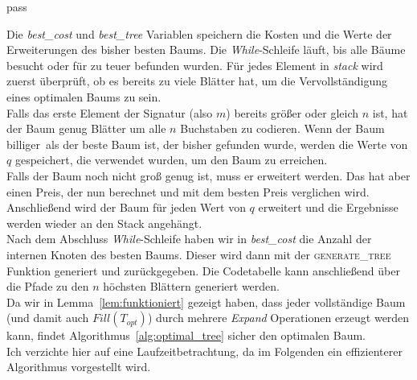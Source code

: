 pass\documentclass[a4paper,10pt,ngerman]{scrartcl}
\begin{document}
    Die \textit{best\_cost} und \textit{best\_tree} Variablen speichern die Kosten und die Werte der Erweiterungen des bisher besten Baums.
    Die \textit{While}-Schleife läuft, bis alle Bäume besucht oder für zu teuer befunden wurden.
    Für jedes Element in \textit{stack} wird zuerst überprüft, ob es bereits zu viele Blätter hat, um die Vervollständigung eines optimalen Baums zu sein.\\
    Falls das erste Element der Signatur (also $m$) bereits größer oder gleich $n$ ist, hat der Baum genug Blätter um alle $n$ Buchstaben zu codieren.
    Wenn der Baum \glqq billiger\grqq~als der beste Baum ist, der bisher gefunden wurde, werden die Werte von $q$ gespeichert, die verwendet wurden, um den Baum zu erreichen. \\
    Falls der Baum noch nicht groß genug ist, muss er erweitert werden.
    Das hat aber einen Preis, der nun berechnet und mit dem besten Preis verglichen wird. \\
    Anschließend wird der Baum für jeden Wert von $q$ erweitert und die Ergebnisse werden wieder an den Stack angehängt. \\
    Nach dem Abschluss \textit{While}-Schleife haben wir in \textit{best\_cost} die Anzahl der internen Knoten des besten Baums.
    Dieser wird dann mit der \textsc{generate\_tree} Funktion generiert und zurückgegeben.
    Die Codetabelle kann anschließend über die Pfade zu den $n$ höchsten Blättern generiert werden. \\
    Da wir in Lemma~\ref{lem:funktioniert} gezeigt haben, dass jeder vollständige Baum (und damit auch $Fill(T_{opt})$) durch mehrere \textit{Expand} Operationen erzeugt werden kann, findet Algorithmus~\ref{alg:optimal_tree} sicher den optimalen Baum. \\

    Ich verzichte hier auf eine Laufzeitbetrachtung, da im Folgenden ein effizienterer Algorithmus vorgestellt wird.
\end{document}
